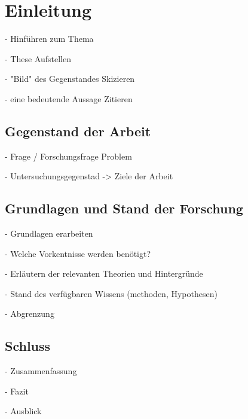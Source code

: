 
\chapter{Einleitung}
- Hinführen zum Thema

- These Aufstellen

- "Bild" des Gegenstandes Skizieren

- eine bedeutende Aussage Zitieren

\section{Gegenstand der Arbeit}
- Frage / Forschungsfrage Problem

- Untersuchungsgegenstad -> Ziele der Arbeit

\section{Grundlagen und Stand der Forschung}
- Grundlagen erarbeiten

- Welche Vorkentnisse werden benötigt?

- Erläutern der relevanten Theorien und Hintergründe

- Stand des verfügbaren Wissens (methoden, Hypothesen)

- Abgrenzung


\section{Schluss}

- Zusammenfassung

- Fazit

- Ausblick
